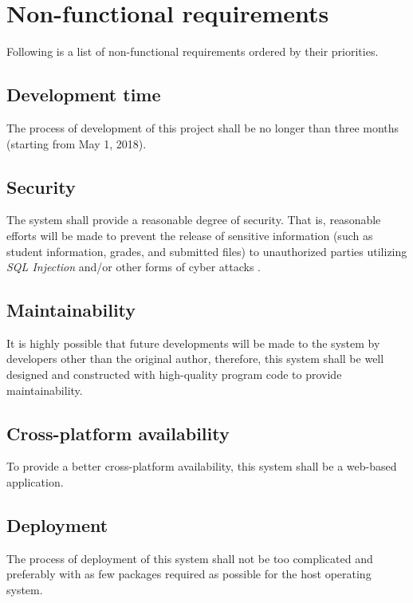 \pagebreak

\section{Non-functional requirements}
Following is a list of non-functional requirements ordered by their priorities.

\subsection{Development time}
The process of development of this project shall be no longer than three
months (starting from May 1, 2018).

\subsection{Security}
The system shall provide a reasonable degree of security.
That is, reasonable efforts will be made to prevent the release of 
sensitive information (such as student information, grades, and
submitted files) to unauthorized parties utilizing \emph{SQL Injection} 
and/or other forms of cyber attacks \cite{cyberAttacks}.

\subsection{Maintainability}
It is highly possible that future developments will be made to the system by
developers other than the original author, therefore, this system shall be
well designed and constructed with high-quality program code to provide
maintainability.

\subsection{Cross-platform availability}
To provide a better cross-platform availability, this system shall be a
web-based application.

\subsection{Deployment}
The process of deployment of this system shall not be too complicated and
preferably with as few packages required as possible for the host operating
system.